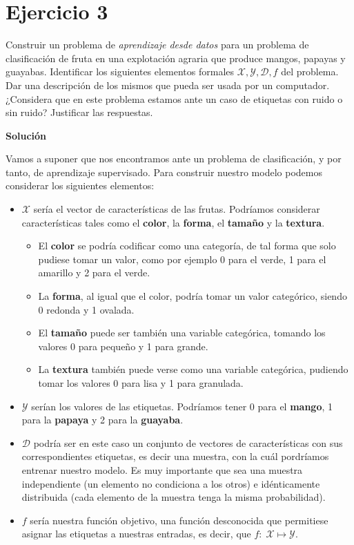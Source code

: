 \documentclass[11pt,a4paper]{article}
\newcommand{\answer}{\noindent\textbf{Solución}}
\begin{document}
\section*{Ejercicio 3}

\noindent Construir un problema de \textit{aprendizaje desde datos} para un problema de clasificación de fruta en una
explotación agraria que produce mangos, papayas y guayabas. Identificar los siguientes elementos formales $\mathcal{X},
\mathcal{Y}, \mathcal{D}, f$ del problema. Dar una descripción de los mismos que pueda ser usada por un computador.
¿Considera que en este problema estamos ante un caso de etiquetas con ruido o sin ruido? Justificar las respuestas.

\answer

Vamos a suponer que nos encontramos ante un problema de clasificación, y por tanto, de aprendizaje supervisado. Para construir
nuestro modelo podemos considerar los siguientes elementos:

\begin{itemize}
	\item $\mathcal{X}$ sería el vector de características de las frutas. Podríamos considerar características tales como
	el \textbf{color}, la \textbf{forma}, el \textbf{tamaño} y la \textbf{textura}. 
	\begin{itemize}
		\item El \textbf{color} se podría codificar como una categoría, de tal forma que solo pudiese tomar un valor, como 
		por ejemplo 0 para el verde, 1 para el amarillo y 2 para el verde.
		\item La \textbf{forma}, al igual que el color, podría tomar un valor categórico, siendo 0 redonda y 1 ovalada.
		\item El \textbf{tamaño} puede ser también una variable categórica, tomando los valores 0 para pequeño y 1 para
		grande.
		\item La \textbf{textura} también puede verse como una variable categórica, pudiendo tomar los valores 0 para
		lisa y 1 para granulada.		
	\end{itemize}
	\item $\mathcal{Y}$ serían los valores de las etiquetas. Podríamos tener 0 para el \textbf{mango}, 1 para la
	\textbf{papaya} y 2 para la \textbf{guayaba}.
	\item $\mathcal{D}$ podría ser en este caso un conjunto de vectores de características con sus correspondientes etiquetas,
	es decir una muestra, con la cuál pordríamos entrenar nuestro modelo. Es muy importante que sea una muestra independiente
	(un elemento no condiciona a los otros) e idénticamente distribuida (cada elemento de la muestra tenga la misma
	probabilidad).
	\item $f$ sería nuestra función objetivo, una función desconocida que permitiese asignar las etiquetas a nuestras
	entradas, es decir, que $f: \; \mathcal{X} \mapsto \mathcal{Y}$.
\end{itemize}
\end{document}
